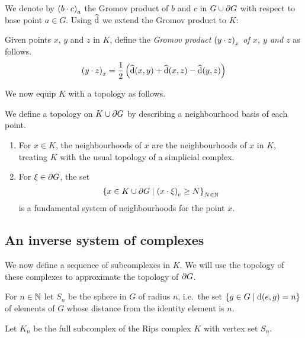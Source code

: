 \documentclass[a4paper]{article}
\begin{document}
We denote by $\gromov{a}{b}{c}$ the Gromov product of $b$ and $c$ in $G \union
\boundary G$ with respect to base point $a \in G$. Using $\newdist$ we extend the
Gromov product to $K$:

\begin{definition}
  Given points $x$, $y$ and $z$ in $K$, define the \emph{Gromov product
  $\gromov{x}{y}{z}$ of $x$, $y$ and $z$} as follows.
  \begin{equation*}
    \gromov{x}{y}{z} = \frac{1}{2}\left(\newdist(x,y) + \newdist(x,z) -
          \newdist(y,z)\right)
  \end{equation*}
\end{definition}

We now equip $K$ with a topology as follows.

\begin{definition}
  We define a topology on $K \union \boundary G$ by describing a neighbourhood
  basis of each point.
  \begin{enumerate}
    \item For $x \in K$, the neighbourhoods of $x$ are the neighbourhoods of
      $x$ in $K$, treating $K$ with the usual topology of a simplicial complex.
    \item For $\xi \in \boundary G$, the set
      \begin{equation*}
        \set{x \in K \union \boundary G 
              \suchthat \gromov{e}{x}{\xi} \geq N}_{N\in\naturals}
      \end{equation*}
      is a fundamental system of neighbourhoods for the point $x$.
  \end{enumerate}
\end{definition}

\subsection{An inverse system of complexes}

We now define a sequence of subcomplexes in $K$. We will use the topology of
these complexes to approximate the topology of $\boundary G$. 

\begin{definition}
  For $n \in \naturals$ let $S_n$ be the sphere in $G$ of radius $n$, i.e.\ the 
  set $\set{g \in G \suchthat \dist(e, g) = n}$ of elements of $G$ whose 
  distance from the identity element is $n$. 

  Let $K_n$ be the full subcomplex of the Rips complex $K$ with vertex set
  $S_n$.
\end{definition}
\end{document}
